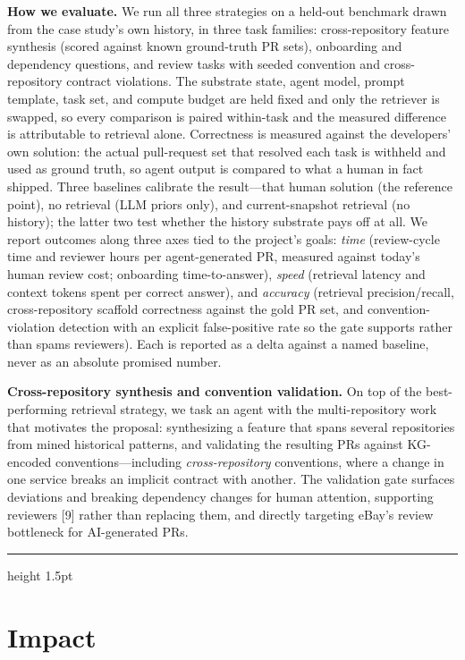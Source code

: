 \documentclass[11pt, letterpaper]{article}
\newcommand{\ehr}{{\color{gray!60}\hrule height 1.5pt}}
\begin{document}
\textbf{How we evaluate.} We run all three strategies on a held-out benchmark drawn from the case study's own history, in three task families: cross-repository feature synthesis (scored against known ground-truth PR sets), onboarding and dependency questions, and review tasks with seeded convention and cross-repository contract violations. The substrate state, agent model, prompt template, task set, and compute budget are held fixed and only the retriever is swapped, so every comparison is paired within-task and the measured difference is attributable to retrieval alone. Correctness is measured against the developers' own solution: the actual pull-request set that resolved each task is withheld and used as ground truth, so agent output is compared to what a human in fact shipped. Three baselines calibrate the result---that human solution (the reference point), no retrieval (LLM priors only), and current-snapshot retrieval (no history); the latter two test whether the history substrate pays off at all. We report outcomes along three axes tied to the project's goals: \emph{time} (review-cycle time and reviewer hours per agent-generated PR, measured against today's human review cost; onboarding time-to-answer), \emph{speed} (retrieval latency and context tokens spent per correct answer), and \emph{accuracy} (retrieval precision/recall, cross-repository scaffold correctness against the gold PR set, and convention-violation detection with an explicit false-positive rate so the gate supports rather than spams reviewers). Each is reported as a delta against a named baseline, never as an absolute promised number.

\textbf{Cross-repository synthesis and convention validation.} On top of the best-performing retrieval strategy, we task an agent with the multi-repository work that motivates the proposal: synthesizing a feature that spans several repositories from mined historical patterns, and validating the resulting PRs against KG-encoded conventions---including \emph{cross-repository} conventions, where a change in one service breaks an implicit contract with another. The validation gate surfaces deviations and breaking dependency changes for human attention, supporting reviewers [9] rather than replacing them, and directly targeting eBay's review bottleneck for AI-generated PRs.

\ehr

\section*{Impact}
\label{sec:impact}
\end{document}
